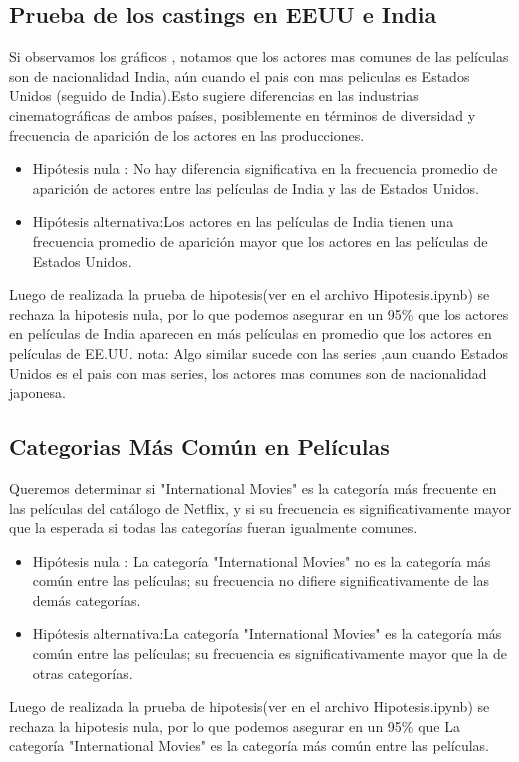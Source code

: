 \documentclass{article}
\begin{document}
\subsection{Prueba de los castings en EEUU e India}
Si observamos los gráficos , notamos que los actores mas comunes de las películas son de nacionalidad India, aún cuando el pais con mas peliculas es Estados Unidos (seguido de India).Esto sugiere diferencias en las industrias cinematográficas de ambos países, posiblemente en términos de diversidad y frecuencia de aparición de los actores en las producciones.

\begin{itemize}
	\item Hipótesis nula : No hay diferencia significativa en la frecuencia promedio de aparición de actores entre las películas de India y las de Estados Unidos.
	\item Hipótesis alternativa:Los actores en las películas de India tienen una frecuencia promedio de aparición mayor que los actores en las películas de Estados Unidos.
\end{itemize}
Luego de realizada la prueba de hipotesis(ver en el archivo Hipotesis.ipynb) se rechaza la hipotesis nula, por lo que podemos asegurar en un 95\%  que los actores en películas de India aparecen en más películas en promedio que los actores en películas de EE.UU.
\newline
\newline
nota: Algo similar sucede con las series ,aun cuando Estados Unidos es el pais con mas series, los actores mas comunes son de nacionalidad  japonesa.





\subsection{ Categorias Más Común en Películas}
Queremos determinar si "International Movies" es la categoría más frecuente en las películas del catálogo de Netflix, y si su frecuencia es significativamente mayor que la esperada si todas las categorías fueran igualmente comunes.
\begin{itemize}
	
	\item Hipótesis nula : La categoría "International Movies" no es la categoría más común entre las películas; su frecuencia no difiere significativamente de las demás categorías.
	\item Hipótesis alternativa:La categoría "International Movies" es la categoría más común entre las películas; su frecuencia es significativamente mayor que la de otras categorías.
\end{itemize}
Luego de realizada la prueba de hipotesis(ver en el archivo Hipotesis.ipynb) se rechaza la hipotesis nula, por lo que podemos asegurar en un 95\%  que  La categoría "International Movies" es la categoría más común entre las películas.
\end{document}
